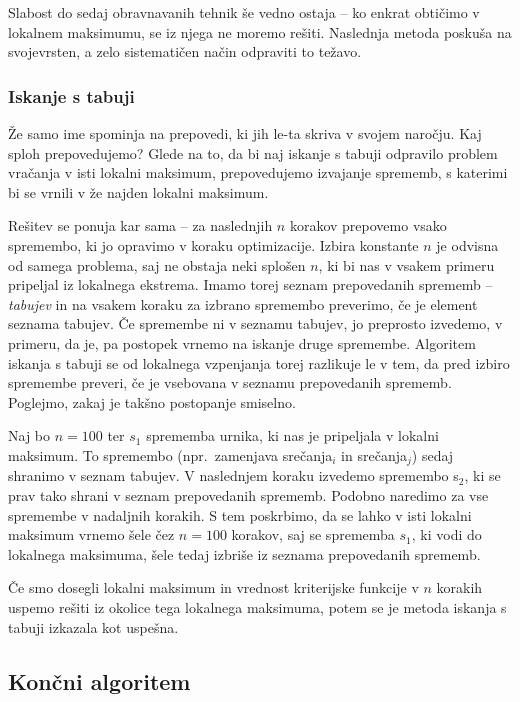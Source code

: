 \documentclass[a4paper, 10pt]{article}
\begin{document}
Slabost do sedaj obravnavanih tehnik še vedno ostaja \--- ko enkrat obtičimo v lokalnem
maksimumu, se iz njega ne moremo rešiti. Naslednja metoda poskuša na svojevrsten, a zelo
sistematičen način odpraviti to težavo.

\subsubsection{Iskanje s tabuji }

Že samo ime spominja na prepovedi, ki jih le-ta skriva v svojem naročju. Kaj sploh prepovedujemo?
Glede na to, da bi naj iskanje s tabuji odpravilo problem vračanja v isti lokalni maksimum,
prepovedujemo izvajanje sprememb, s katerimi bi se vrnili v že najden lokalni maksimum.

Rešitev se ponuja kar sama  \---  za naslednjih $n$ korakov prepovemo vsako spremembo, ki jo
opravimo v koraku optimizacije. Izbira konstante $n$ je odvisna od samega problema, saj
ne obstaja neki splošen $n$, ki bi nas v vsakem primeru pripeljal iz lokalnega ekstrema.
Imamo torej seznam prepovedanih sprememb \--- \emph{tabujev} in na vsakem koraku za izbrano
spremembo preverimo, če je element seznama tabujev. Če spremembe ni v seznamu tabujev, jo
preprosto izvedemo, v primeru, da je, pa postopek vrnemo na iskanje druge spremembe.
Algoritem iskanja s tabuji se od lokalnega vzpenjanja torej razlikuje le v tem, da pred
izbiro spremembe preveri, če je vsebovana v seznamu prepovedanih sprememb. Poglejmo, zakaj
je takšno postopanje smiselno.

Naj bo $n = 100$ ter $s_{1}$ sprememba urnika, ki nas je pripeljala v lokalni maksimum. To
spremembo (npr.\ zamenjava srečanja$_{i}$ in srečanja$_{j}$) sedaj shranimo v
seznam tabujev. V naslednjem koraku izvedemo spremembo s$_{2}$, ki se prav tako shrani v
seznam prepovedanih sprememb. Podobno naredimo za vse spremembe v nadaljnih korakih. S
tem poskrbimo, da se lahko v isti lokalni maksimum vrnemo šele čez $n = 100$ korakov, saj
se sprememba $s_{1}$, ki vodi do lokalnega maksimuma, šele tedaj izbriše iz seznama
prepovedanih sprememb.

Če smo dosegli lokalni maksimum in vrednost kriterijske funkcije v $n$ korakih uspemo
rešiti iz okolice tega lokalnega maksimuma, potem se je metoda iskanja s tabuji izkazala
kot uspešna.

\subsection{Končni algoritem}
\end{document}
